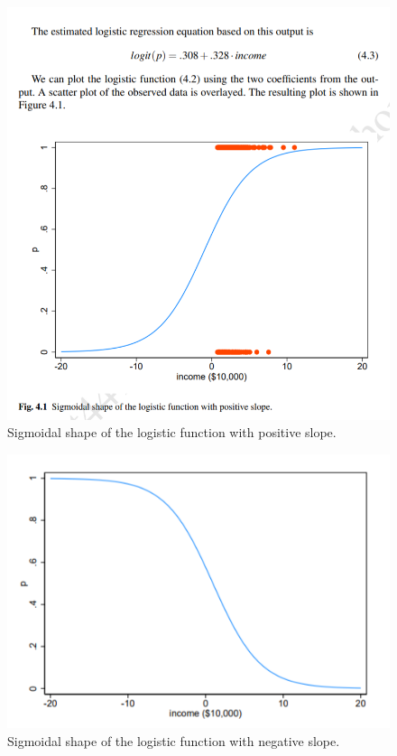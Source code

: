 \documentclass[12pt, oneside]{article}
\begin{document}
\begin{figure}[!ht]
    \centering
    \includegraphics[width=\textwidth]{Sigmoidal shape of the logistic function with positive slope.png}        
   \caption{Sigmoidal shape of the logistic function with positive slope.}
    \label{fig:my_label}
\end{figure}


\begin{figure}[!ht]
    \centering
    \includegraphics[width=\textwidth]{Sigmoidal shape of logistic function with negative slope.png}        
   \caption{Sigmoidal shape of the logistic function with negative slope.}
    \label{fig:my_label}
\end{figure}
\end{document}
